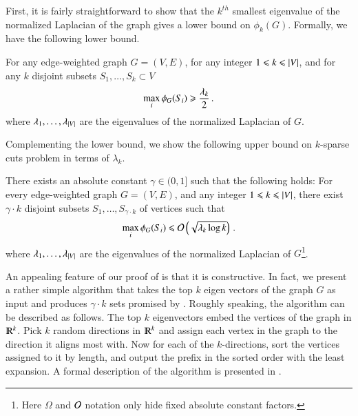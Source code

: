 \documentclass[11pt]{article}
\begin{document}
First, it is fairly straightforward to show that the $k^{th}$ smallest eigenvalue  of the normalized
Laplacian of the graph gives a lower bound on $\phi_k(G)$.  
%
Formally, we have the following lower bound.
%
\begin{proposition}
\label{prop:lower}
For any edge-weighted graph $G=(V,E)$, for any integer $1 \leqslant k \leqslant
\left\lvert V\right\rvert$, and for any $k$ disjoint subsets $S_1, \ldots, S_k \subset V$
\[ \max_i \phi_G(S_i) \geqslant  \frac{\lambda_{k}}{2} \,. \]
where $\lambda_1, \ldots, \lambda_{\left\lvert V\right\rvert}$ are the eigenvalues of the
normalized Laplacian of $G$.
\end{proposition}
%
Complementing the lower bound, we show the following upper bound on
$k$-sparse cuts problem in terms of $\lambda_k$.
%
\begin{theorem}
\label{thm:ksets}
There exists an absolute constant $\gamma \in (0,1]$ such that the following holds:  
For every edge-weighted graph $G=(V,E)$, and any integer $1 \leqslant k \leqslant \left\lvert V\right\rvert$, there exist $\gamma\cdot k$ disjoint subsets $S_1, \ldots, S_{\gamma \cdot k}$ of vertices such that
\[  \max_i \phi_G(S_i) \leqslant \mathcal O\left(\sqrt{\lambda_{k} \log k}\right) \,. \]
where $\lambda_1, \ldots, \lambda_{\left\lvert V\right\rvert}$ are the eigenvalues of the normalized Laplacian of $G$\footnote{Here $\Omega$ and $\mathcal O$ notation only hide fixed absolute constant factors.}. 
%
\end{theorem}
%
%
%
%
%

An appealing feature of our proof of  is that it
is constructive.
%
In fact, we present a rather simple algorithm that takes the top $k$ eigen
vectors of the graph $G$ as input and produces $\gamma\cdot k$ sets promised by
.
%
Roughly speaking, the algorithm can be described as follows.  The top
$k$ eigenvectors embed the vertices of the graph in $\R^k$.  Pick $k$
random directions in $\R^k$ and assign each vertex in the graph to the
direction it aligns most with.  Now for each of the $k$-directions,
sort the vertices assigned to it by length, and output the prefix in the
sorted order with the least expansion.  A formal description of the
algorithm is presented in .  
\end{document}
